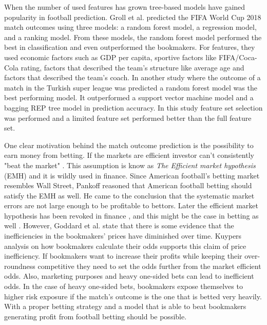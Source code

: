 When the number of used features has grown tree-based models have gained popularity in football prediction. Groll et al.\cite{groll2018prediction} predicted the FIFA World Cup 2018 match outcomes using three models: a random forest model, a regression model, and a ranking model. From these models, the random forest model performed the best in classification and even outperformed the bookmakers. For features, they used economic factors such as GDP per capita, sportive factors like FIFA/Coca-Cola rating, factors that described the team's structure like average age and factors that described the team's coach. In another study where the outcome of a match in the Turkish super league was predicted a random forest model was the best performing model. It outperformed a support vector machine model and a bagging REP tree model in prediction accuracy. In this study feature set selection was performed and a limited feature set performed better than the full feature set. \cite{10.1007/978-3-319-29504-6_48}

One clear motivation behind the match outcome prediction is the possibility to earn money from betting. If the markets are efficient investor can't consistently "beat the market" \cite{badarinathi1996football}. This assumption is know as \textit{The Efficient market hypothesis} (EMH) and it is wildly used in finance. Since American football's betting market resembles Wall Street, Pankoff \cite{pankoff1968market} reasoned that American football betting should satisfy the EMH as well. He came to the conclusion that the systematic market errors are not large enough to be profitable to bettors. Later the efficient market hypothesis has been revoked in finance \cite{jegadeesh1993returns}, and this might be the case in betting as well \cite{goddard2003modelling, badarinathi1996football}. However, Goddard et al. \cite{goddard2003modelling} state that there is some evidence that the inefficiencies in the bookmakers’ prices have diminished over time. Kuypers \cite{kuypers2008} analysis on how bookmakers calculate their odds supports this claim of price inefficiency. If bookmakers want to increase their profits while keeping their over-roundness competitive they need to set the odds further from the market efficient odds. Also, marketing purposes and heavy one-sided bets can lead to inefficient odds. In the case of heavy one-sided bets, bookmakers expose themselves to higher risk exposure if the match's outcome is the one that is betted very heavily. With a proper betting strategy and a model that is able to beat bookmakers generating profit from football betting should be possible.

